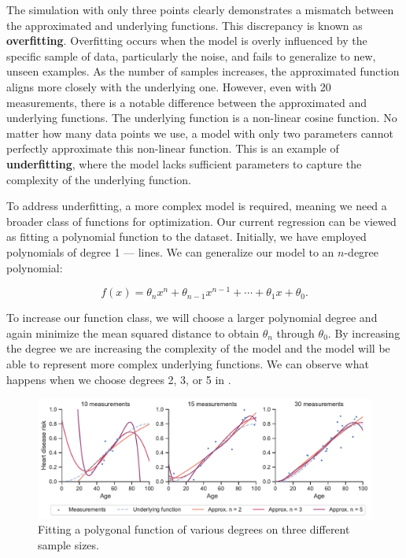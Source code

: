 The simulation with only three points clearly demonstrates a mismatch between the approximated and underlying functions. This discrepancy is known as \textbf{overfitting}. Overfitting occurs when the model is overly influenced by the specific sample of data, particularly the noise, and fails to generalize to new, unseen examples. As the number of samples increases, the approximated function aligns more closely with the underlying one. However, even with 20 measurements, there is a notable difference between the approximated and underlying functions. The underlying function is a non-linear cosine function. No matter how many data points we use, a model with only two parameters cannot perfectly approximate this non-linear function. This is an example of \textbf{underfitting}, where the model lacks sufficient parameters to capture the complexity of the underlying function.

To address underfitting, a more complex model is required, meaning we need a broader class of functions for optimization. Our current regression can be viewed as fitting a polynomial function to the dataset. Initially, we have employed polynomials of degree 1 — lines. We can generalize our model to an $n$-degree polynomial:

\begin{equation}
	f(x) = \theta_n x^n + \theta_{n-1}x^{n-1} + \cdots + \theta_1 x + \theta_0.
\end{equation}

To increase our function class, we will choose a larger polynomial degree and again minimize the mean squared distance to obtain $\theta_n$ through $\theta_0$. By increasing the degree we are increasing the complexity of the model and the model will be able to represent more complex underlying functions. We can observe what happens when we choose degrees 2, 3, or 5 in .

\begin{figure}[h!]
 \centering
 \includegraphics[width=\linewidth]{images/3/heart_disease_risk_samples_degrees}
 \caption{Fitting a polygonal function of various degrees on three different sample sizes.}
 \label{fig:reg-deg-2}
\end{figure}


